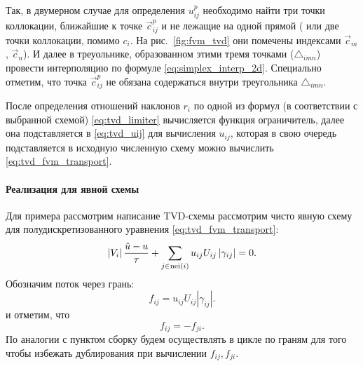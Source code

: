 Так, в двумерном случае для определения $u^p_{ij}$
необходимо найти три точки коллокации,
ближайшие к точке $\vec c^p_{ij}$ и не лежащие на одной прямой (
или две точки коллокации, помимо $c_i$. На рис.~\ref{fig:fvm_tvd}
они помечены индексами $\vec c_m$, $\vec c_n$).
И далее в треуольнике, образованном этими тремя
точками ($\triangle_{imn}$) провести
интерполяцию
по формуле \cref{eq:simplex_interp_2d}.
Специально отметим, что точка $\vec c^p_{ij}$
не обязана содержаться внутри 
треугольника $\triangle_{imn}$.

После определения отношений наклонов $r_i$
по одной из формул (в соответствии
с выбранной схемой) \cref{eq:tvd_limiter}
вычисляется функция ограничитель,
далее она подставляется в \cref{eq:tvd_uij} для
вычисления $u_{ij}$, которая в свою
очередь подставляется в исходную численную схему
можно вычислить \cref{eq:tvd_fvm_transport}.

\paragraph{Реализация для явной схемы}
Для примера рассмотрим написание TVD-схемы
рассмотрим чисто явную схему для полудискретизованного уравнения \cref{eq:tvd_fvm_transport}:
\begin{equation}
\label{eq:tvd_fvm_explicit_transport}
\left| V_i \right|
\frac{\hat u - u}{\tau}
+ \sum_{j\in {\rm nei}(i)} {u_{ij} U_{ij} \left|\gamma_{ij}\right|}
= 0.
\end{equation}
Обозначим поток через грань:
\begin{equation}
\nonumber
f_{ij} = u_{ij} U_{ij} |\gamma_{ij}|.
\end{equation}
и отметим, что
\begin{equation}
\label{eq:tvd_fij_fji}
f_{ij} = -f_{ji}.
\end{equation}
По аналогии с пунктом \label{sec:fvm_face_assemble}
сборку будем осуществлять в цикле по граням
для того чтобы избежать дублирования при вычислении $f_{ij}, f_{ji}$.

